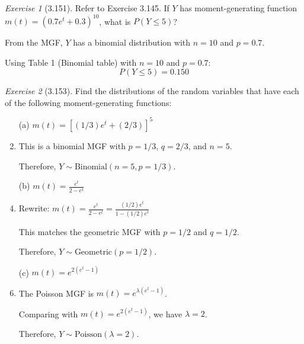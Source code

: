 \documentclass[12pt]{amsart}
\makeatletter
\theoremstyle{remark}
\newtheorem*{exercise}{Exercise}%
\renewenvironment{proof}[1][\proofname]{\par\doublespacing
  \pushQED{\qed}%
  \normalfont \topsep6\p@\@plus6\p@\relax
  \list{}{%
    \settowidth{\leftmargin}{\itshape\proofname:\hskip\labelsep}%
    \setlength{\labelwidth}{0pt}%
    \setlength{\itemindent}{-\leftmargin}%
  }%
  \item[\hskip\labelsep\itshape#1\@addpunct{:}]\ignorespaces
}{%
  \popQED\endlist\@endpefalse
  \singlespacing
}
\theoremstyle{mycomment}
\makeatother
\begin{document}
\begin{exercise}[3.151]
Refer to Exercise 3.145. If $Y$ has moment-generating function $m(t) = (0.7e^t + 0.3)^{10}$, what is $P(Y \leq 5)$?

\begin{proof}[Solution]
 From the MGF, $Y$ has a binomial distribution with $n = 10$ and $p = 0.7$.
	
	Using Table 1 (Binomial table) with $n = 10$ and $p = 0.7$:
	$$P(Y \leq 5) = 0.150$$
\end{proof}
\end{exercise}

\begin{exercise}[3.153]
Find the distributions of the random variables that have each of the following moment-generating functions:

\begin{enumerate}
    \item[(a)] $m(t) = [(1/3)e^t + (2/3)]^5$
\begin{proof}[Solution]
 This is a binomial MGF with $p = 1/3$, $q = 2/3$, and $n = 5$.
	
	Therefore, $Y \sim \text{Binomial}(n = 5, p = 1/3)$.
\end{proof}
    \item[(b)] $m(t) = \frac{e^t}{2 - e^t}$
\begin{proof}[Solution]
 Rewrite: $m(t) = \frac{e^t}{2 - e^t} = \frac{(1/2)e^t}{1 - (1/2)e^t}$
	
	This matches the geometric MGF with $p = 1/2$ and $q = 1/2$.
	
	Therefore, $Y \sim \text{Geometric}(p = 1/2)$.
\end{proof}
    \item[(c)] $m(t) = e^{2(e^t - 1)}$
\begin{proof}[Solution]
 The Poisson MGF is $m(t) = e^{\lambda(e^t - 1)}$.
	
	Comparing with $m(t) = e^{2(e^t - 1)}$, we have $\lambda = 2$.
	
	Therefore, $Y \sim \text{Poisson}(\lambda = 2)$.
\end{proof}
\end{enumerate} 
\end{exercise}
\end{document}
